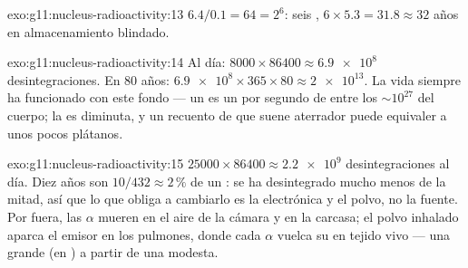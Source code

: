 \begin{solution}{exo:g11:nucleus-radioactivity:13}
$6.4/0.1 = 64 = 2^{6}$: seis ,
$6 \times 5.3 = 31.8 \approx 32$ años en almacenamiento blindado.
\end{solution}

\begin{solution}{exo:g11:nucleus-radioactivity:14}
Al día: $8000 \times 86400 \approx \num{6.9e8}$ desintegraciones. En
$80$ años: $\num{6.9e8} \times 365 \times 80 \approx \num{2e13}$. La
vida siempre ha funcionado con este fondo --- un  es un 
por segundo de entre los $\sim 10^{27}$ del cuerpo; la  es
diminuta, y un recuento de  que suene aterrador puede
equivaler a unos pocos plátanos.
\end{solution}

\begin{solution}{exo:g11:nucleus-radioactivity:15}
$\num{25000} \times 86400 \approx \num{2.2e9}$ desintegraciones al día.
Diez años son $10/432 \approx 2\,\%$ de un : se ha desintegrado
mucho menos de la mitad, así que lo que obliga a cambiarlo es la
electrónica y el polvo, no la fuente. Por fuera, las $\alpha$ mueren en
el aire de la cámara y en la carcasa; el polvo inhalado aparca el emisor
en los pulmones, donde cada $\alpha$ vuelca su  en tejido vivo
--- una  grande (en ) a partir de una  modesta.
\end{solution}

